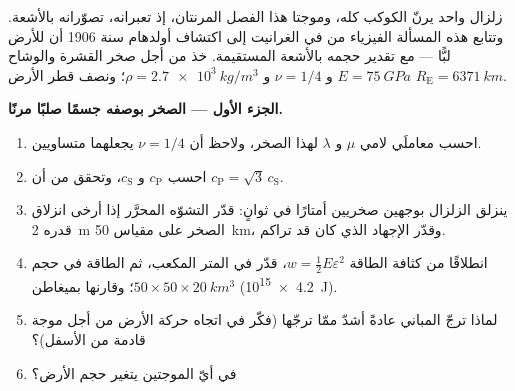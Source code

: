 \begin{problem}\label{pb:b3:continuum-elasticity:1}
زلزال واحد يرنّ الكوكب كله، وموجتا هذا الفصل المرنتان، إذ
تعبرانه، تصوّرانه بالأشعة. وتتابع هذه المسألة الفيزياء من  في الغرانيت إلى اكتشاف أولدهام سنة 1906 أن للأرض لبًّا ---
مع تقدير حجمه بالأشعة المستقيمة. خذ من أجل صخر القشرة والوشاح
$E = \qty{75}{GPa}$ و $\nu = 1/4$ و
$\rho = \qty{2.7e3}{kg/m^3}$؛ ونصف قطر الأرض $R_{\text{E}} =
\qty{6371}{km}$.

\medskip\noindent\textbf{الجزء الأول --- الصخر بوصفه جسمًا صلبًا مرنًا.}
\begin{enumerate}
  \item احسب معاملَي لامي $\mu$ و $\lambda$ لهذا
        الصخر، ولاحظ أن $\nu = 1/4$ يجعلهما متساويين.
  \item احسب $c_{\text{P}}$ و $c_{\text{S}}$، وتحقق من أن
        $c_{\text{P}} = \sqrt3\,c_{\text{S}}$.
  \item ينزلق الزلزال بوجهين صخريين أمتارًا في ثوانٍ:
        قدّر التشوّه المحرَّر إذا أرخى انزلاق قدره \qty{2}{m}
        الصخر على مقياس \qty{50}{km}، وقدّر الإجهاد الذي كان قد
        تراكم.
  \item انطلاقًا من كثافة الطاقة $w = \tfrac12 E\varepsilon^2$،
        قدّر  في المتر المكعب، ثم الطاقة
        في حجم $50 \times 50 \times \qty{20}{km^3}$؛ وقارنها
        بميغاطن (\qty{4.2e15}{J}).
  \item لماذا ترجّ  المباني عادةً أشدّ ممّا ترجّها
         (فكّر في اتجاه حركة الأرض من أجل موجة
        قادمة من الأسفل)؟
  \item في أيّ الموجتين يتغير حجم الأرض؟
\end{enumerate}


\end{problem}
